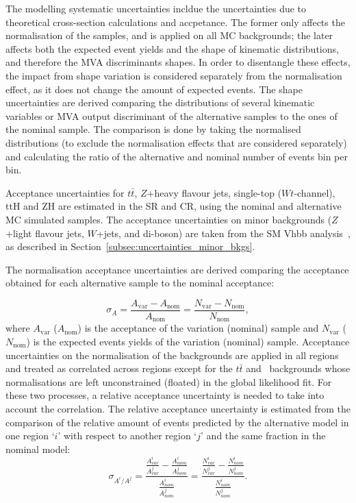 The modelling systematic uncertainties incldue the 
uncertainties due to theoretical cross-section calculations
and accpetance. The former only affects the normalisation of the
samples, and is applied on all MC backgrounds; the later
affects both the expected event yields and the shape of
kinematic distributions, and therefore the MVA discriminants
shapes. In order to disentangle these effects, the 
impact from shape variation is considered 
separately from the normalisation effect,
as it does not change the amount of expected events.
The shape uncertainties are derived comparing the 
distributions of several kinematic variables or MVA output
discriminant of the alternative samples to the ones of the nominal sample. 
The comparison is done by taking the normalised distributions 
(to exclude the normalisation effects that are 
considered separately) and calculating the ratio of 
the alternative and nominal number of events bin per bin. 

Acceptance uncertainties for $t\bar{t}$, $Z$+heavy flavour jets, 
single-top ($Wt$-channel), ttH and ZH are estimated in the SR and CR, 
using the nominal and alternative MC simulated samples. 
The acceptance uncertainties on minor 
backgrounds ($Z$+light flavour jets, $W$+jets, and di-boson) 
are taken from the SM Vhbb analysis~\cite{ATLAS-CONF-2020-006}, as 
described in Section~\ref{subsec:uncertainties_minor_bkgs}. 

The normalisation acceptance uncertainties are derived comparing the 
acceptance obtained for each alternative sample 
to the nominal acceptance:

\begin{equation}
    \sigma_{A}= \frac{A_\text{var} - A_\text{nom}}{A_\text{nom}} = \frac{N_\text{var}-N_\text{nom}}{N_\text{nom}},
    \label{eq:acceptance_unc}
\end{equation}
where $A_\text{var}$ ($A_\text{nom}$) is the acceptance of the 
variation (nominal) sample and  $N_\text{var}$ ($N_\text{nom}$) 
is the expected events yields of the variation (nominal) sample. 
Acceptance uncertainties on the normalisation of the 
backgrounds are applied in all regions and 
treated as correlated across regions except for the 
$t\bar{t}$ and \ZHF\ backgrounds whose normalisations 
are left unconstrained (floated) in the global likelihood fit. 
For these two processes, a relative acceptance uncertainty is needed
to take into account the correlation.
The relative acceptance uncertainty is estimated
from the comparison of the relative amount of events predicted by the 
alternative model in one region `$i$' with 
respect to another region `$j$' and the same fraction 
in the nominal model:
\begin{equation}
\sigma_{A^i/A^j}= \frac{\frac{A_{var}^i}{A_{var}^j} - \frac{A_{nom}^i}{A_{nom}^j}}
{\frac{A_{nom}^i}{A_{nom}^j}} = 
\frac{ \frac{N_{var}^i}{N_{var}^j} - \frac{N_{nom}^i}{N_{nom}^j} } {\frac{N_{nom}^i}{N_{nom}^j}}.
\label{eq:relative_acceptance_unc}
\end{equation}

